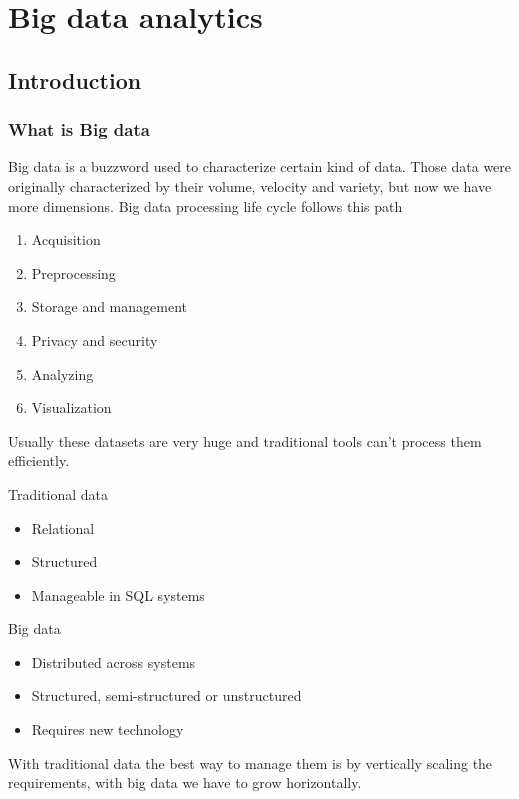 \section{Big data analytics}

\subsection{Introduction}

\subsubsection{What is Big data}

Big data is a buzzword used to characterize certain kind of data. Those data were originally characterized by their volume, velocity and variety, but now we have more dimensions. Big data processing life cycle follows this path

\begin{enumerate}
    \item Acquisition
    \item Preprocessing
    \item Storage and management
    \item Privacy and security
    \item Analyzing
    \item Visualization
\end{enumerate}

Usually these datasets are very huge and traditional tools can't process them efficiently. 

\vspace{10pt}

Traditional data 

\begin{itemize}
    \item Relational
    \item Structured
    \item Manageable in SQL systems
\end{itemize}

Big data
\begin{itemize}
    \item Distributed across systems
    \item Structured, semi-structured or unstructured
    \item Requires new technology
\end{itemize}

With traditional data the best way to manage them is by vertically scaling the requirements, with big data we have to grow horizontally. 

